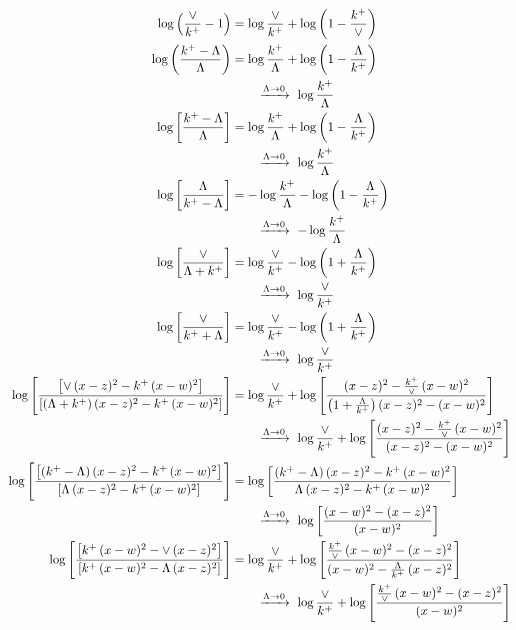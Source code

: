 \documentclass[10pt]{article}
\numberwithin{equation}{section}
\begin{document}
\begin{align}
\log{\left(\frac{\vee}{k^{+}}-1\right)} &= \log\frac{\vee}{k^+} + \log{\left(1-\frac{k^{+}}{\vee}\right)} \notag\\
\log{\left(\frac{k^{+}-\Lambda}{\Lambda}\right)} &= \log\frac{k^+}{\Lambda} + \log{\left(1-\frac{\Lambda}{k^{+}}\right)}\notag\\&\qquad\xrightarrow{\Lambda\to0}\ \log\frac{k^+}{\Lambda} \notag\\
\log{\left[\frac{k^{+}-\Lambda}{\Lambda}\right]} &= \log\frac{k^+}{\Lambda} + \log{\left(1-\frac{\Lambda}{k^{+}}\right)}\notag\\&\qquad\xrightarrow{\Lambda\to0}\ \log\frac{k^+}{\Lambda} \notag\\
\log{\left[\frac{\Lambda}{k^{+}-\Lambda}\right]} &= -\log\frac{k^+}{\Lambda} - \log{\left(1-\frac{\Lambda}{k^{+}}\right)}\notag\\&\qquad\xrightarrow{\Lambda\to0}\ -\log\frac{k^+}{\Lambda} \notag\\
\log{\left[\frac{\vee}{\Lambda+k^{+}}\right]} &= \log\frac{\vee}{k^+} - \log{\left(1+\frac{\Lambda}{k^{+}}\right)}\notag\\&\qquad\xrightarrow{\Lambda\to0}\ \log\frac{\vee}{k^+} \notag\\
\log{\left[\frac{\vee}{k^{+}+\Lambda}\right]} &= \log\frac{\vee}{k^+} - \log{\left(1+\frac{\Lambda}{k^{+}}\right)}\notag\\&\qquad\xrightarrow{\Lambda\to0}\ \log\frac{\vee}{k^+} \notag\\
\log{\left[\frac{\left[\vee\, (x-z)^{2} - k^{+}\, (x-w)^{2}\right]}{\left[(\Lambda + k^{+})\, (x-z)^{2} - k^{+}\, (x-w)^{2}\right]}\right]} &= \log\frac{\vee}{k^+} + \log{\left[\frac{(x-z)^{2}-\frac{k^{+}}{\vee}\,(x-w)^{2}}{\left(1+\frac{\Lambda}{k^{+}}\right)(x-z)^{2}-(x-w)^{2}}\right]}\notag\\&\qquad\xrightarrow{\Lambda\to0}\ \log\frac{\vee}{k^+} + \log{\left[\frac{(x-z)^{2}-\frac{k^{+}}{\vee}\,(x-w)^{2}}{(x-z)^{2}-(x-w)^{2}}\right]} \notag\\
\log{\left[\frac{\left[(k^{+}-\Lambda)\, (x-z)^{2} - k^{+}\, (x-w)^{2}\right]}{\left[\Lambda\, (x-z)^{2} - k^{+}\, (x-w)^{2}\right]}\right]} &= \log{\left[\frac{(k^{+}-\Lambda)\,(x-z)^{2}-k^{+}\,(x-w)^{2}}{\Lambda\,(x-z)^{2}-k^{+}\,(x-w)^{2}}\right]}\notag\\&\qquad\xrightarrow{\Lambda\to0}\ \log{\left[\frac{(x-w)^{2}-(x-z)^{2}}{(x-w)^{2}}\right]} \notag\\
\log{\left[\frac{\left[k^{+}\,(x-w)^{2}-\vee\, (x-z)^{2}\right]}{\left[k^{+}\,(x-w)^{2}-\Lambda\, (x-z)^{2}\right]}\right]} &= \log\frac{\vee}{k^+} + \log{\left[\frac{\frac{k^{+}}{\vee}\,(x-w)^{2}-(x-z)^{2}}{(x-w)^{2}-\frac{\Lambda}{k^{+}}\,(x-z)^{2}}\right]}\notag\\&\qquad\xrightarrow{\Lambda\to0}\ \log\frac{\vee}{k^+} + \log{\left[\frac{\frac{k^{+}}{\vee}\,(x-w)^{2}-(x-z)^{2}}{(x-w)^{2}}\right]} \notag\\

\end{align}
\end{document}
